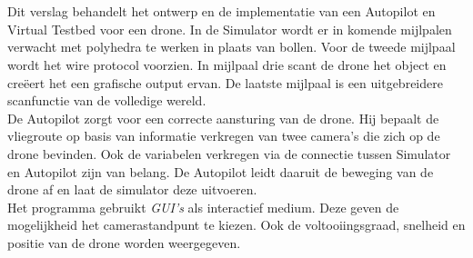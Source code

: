 \\\\
Dit verslag behandelt het ontwerp en de implementatie van een Autopilot en Virtual Testbed voor een drone. In de Simulator wordt er in komende mijlpalen verwacht met polyhedra te werken in plaats van bollen. Voor de tweede mijlpaal wordt het wire protocol voorzien. In mijlpaal drie scant de drone het object en cre\"eert het een grafische output ervan. De laatste mijlpaal is een uitgebreidere scanfunctie van de volledige wereld. 
\\
De Autopilot zorgt voor een correcte aansturing van de drone. Hij bepaalt de vliegroute op basis van informatie verkregen van twee camera's die zich op de drone bevinden. Ook de variabelen verkregen via de connectie tussen Simulator en Autopilot zijn van belang. De Autopilot leidt daaruit de beweging van de drone af en laat de simulator deze uitvoeren.
\\
Het programma gebruikt \textit{GUI's} als interactief medium. Deze geven de mogelijkheid het camerastandpunt te kiezen. Ook de voltooiingsgraad, snelheid en positie van de drone worden weergegeven.\\\\
\\\\